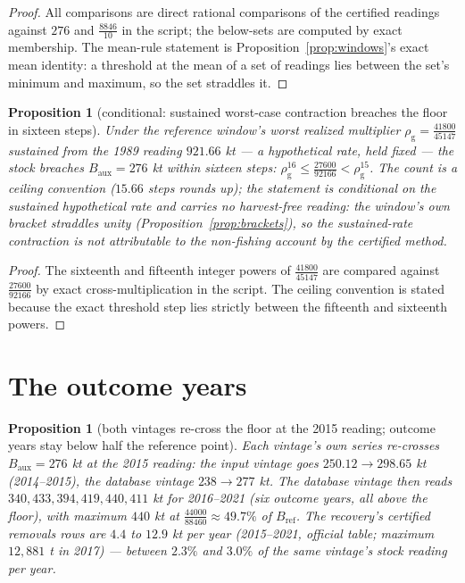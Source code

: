 \documentclass[10pt,twocolumn]{article}
\theoremstyle{plain}
\newtheorem{proposition}[theorem]{Proposition}
\theoremstyle{remark}
\begin{document}
\begin{proof}
All comparisons are direct rational comparisons of the certified
readings against \(276\) and \(\tfrac{8846}{10}\) in the script; the
below-sets are computed by exact membership. The mean-rule statement
is Proposition~\ref{prop:windows}'s exact mean identity: a threshold
at the mean of a set of readings lies between the set's minimum and
maximum, so the set straddles it.
\end{proof}

\begin{proposition}[conditional: sustained worst-case contraction
breaches the floor in sixteen steps]\label{prop:sustained}
Under the reference window's worst realized multiplier
\(\rho_{\mathrm{g}} = \tfrac{41800}{45147}\) sustained from the 1989
reading \(921.66\) kt --- a hypothetical rate, held fixed ---
the stock breaches \(B_{\mathrm{aux}} = 276\) kt within sixteen steps:
\(\rho_{\mathrm{g}}^{16} \le \tfrac{27600}{92166} < \rho_{\mathrm{g}}^{15}\).
The count is a ceiling convention (\(15.66\) steps rounds up); the
statement is conditional on the sustained hypothetical rate and
carries no harvest-free reading: the window's own bracket straddles
unity (Proposition~\ref{prop:brackets}), so the sustained-rate
contraction is not attributable to the non-fishing account by the
certified method.
\end{proposition}

\begin{proof}
The sixteenth and fifteenth integer powers of
\(\tfrac{41800}{45147}\) are compared against
\(\tfrac{27600}{92166}\) by exact cross-multiplication in the script.
The ceiling convention is stated because the exact threshold step lies
strictly between the fifteenth and sixteenth powers.
\end{proof}

\section{The outcome years}\label{outcome}

\begin{proposition}[both vintages re-cross the floor at the 2015
reading; outcome years stay below half the reference point]
\label{prop:recovery}
Each vintage's own series re-crosses \(B_{\mathrm{aux}} = 276\) kt at
the 2015 reading: the input vintage goes \(250.12 \to 298.65\) kt
(2014--2015), the database vintage \(238 \to 277\) kt. The database
vintage then reads \(340, 433, 394, 419, 440, 411\) kt for
2016--2021 (six outcome years, all above the floor), with maximum
\(440\) kt at \(\tfrac{44000}{88460} \approx 49.7\%\) of
\(B_{\mathrm{ref}}\). The recovery's certified removals rows are
\(4.4\) to \(12.9\) kt per year (2015--2021, official table; maximum
\(12{,}881\) t in 2017) --- between \(2.3\%\) and \(3.0\%\) of the
same vintage's stock reading per year.
\end{proposition}
\end{document}
